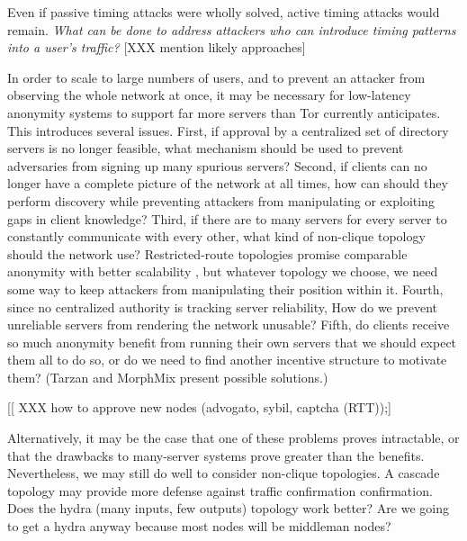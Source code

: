 \documentclass[times,10pt,twocolumn]{article}
\begin{document}
Even if passive timing attacks were wholly solved, active timing
attacks would remain.  \emph{What can
  be done to address attackers who can introduce timing patterns into
  a user's traffic?}  [XXX mention likely approaches]

%

In order to scale to large numbers of users, and to prevent an
attacker from observing the whole network at once, it may be necessary
for low-latency anonymity systems to support far more servers than Tor
currently anticipates.  This introduces several issues.  First, if
approval by a centralized set of directory servers is no longer
feasible, what mechanism should be used to prevent adversaries from
signing up many spurious servers? 
Second, if clients can no longer have a complete
picture of the network at all times, how can should they perform
discovery while preventing attackers from manipulating or exploiting
gaps in client knowledge?  Third, if there are to many servers
for every server to constantly communicate with every other, what kind
of non-clique topology should the network use?   Restricted-route
topologies promise comparable anonymity with better scalability
\cite{danezis-pets03}, but whatever topology we choose, we need some
way to keep attackers from manipulating their position within it.
Fourth, since no centralized authority is tracking server reliability,
How do we prevent unreliable servers from rendering the network
unusable?  Fifth, do clients receive so much anonymity benefit from
running their own servers that we should expect them all to do so, or
do we need to find another incentive structure to motivate them?
(Tarzan and MorphMix present possible solutions.)

[[ XXX how to approve new nodes (advogato, sybil, captcha (RTT));]

Alternatively, it may be the case that one of these problems proves
intractable, or that the drawbacks to many-server systems prove
greater than the benefits.  Nevertheless, we may still do well to
consider non-clique topologies.  A cascade topology may provide more
defense against traffic confirmation confirmation.
Does the hydra (many inputs, few outputs) topology work
better? Are we going to get a hydra anyway because most nodes will be
middleman nodes?
\end{document}
